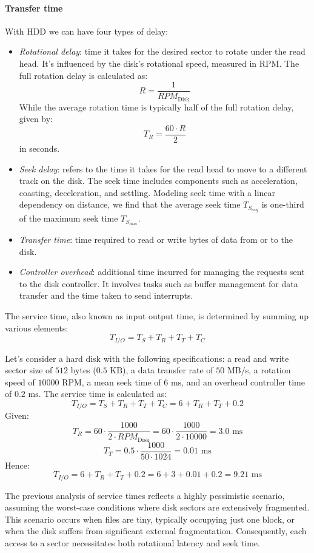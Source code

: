 \paragraph*{Transfer time}
With HDD we can have four types of delay: 
\begin{itemize}
    \item \textit{Rotational delay}: time it takes for the desired sector to rotate under the read head. 
        It's influenced by the disk's rotational speed, measured in RPM.
        The full rotation delay is calculated as: 
        \[R=\dfrac{1}{RPM_{\text{Disk}}}\]
        While the average rotation time is typically half of the full rotation delay, given by: 
        \[T_{R}=\dfrac{60\cdot R}{2}\]
        in seconds.
    \item \textit{Seek delay}: refers to the time it takes for the read head to move to a different track on the disk. 
        The seek time includes components such as acceleration, coasting, deceleration, and settling. 
        Modeling seek time with a linear dependency on distance, we find that the average seek time $T_{S_{avg}}$ is one-third of the maximum seek time $T_{S_{\max}}$. 
    \item \textit{Transfer time}: time required to read or write bytes of data from or to the disk. 
    \item \textit{Controller overhead}: additional time incurred for managing the requests sent to the disk controller.
        It involves tasks such as buffer management for data transfer and the time taken to send interrupts.
\end{itemize}
The service time, also known as input output time, is determined by summing up various elements:
\[T_{I/O}=T_{S}+T_{R}+T_{T}+T_{C}\]
\begin{example}
    Let's consider a hard disk with the following specifications: a read and write sector size of $512$ bytes ($0.5\text{ KB}$), a data transfer rate of $50$ MB/s, a rotation speed of $10000$ RPM, a mean seek time of $6\text{ ms}$, and an overhead controller time of $0.2\text{ ms}$.
    The service time is calculated as:
    \[T_{I/O}=T_{S}+T_{R}+T_{T}+T_{C}=6+T_{R}+T_{T}+0.2\]
    Given:
    \[T_{R}=60\cdot\dfrac{1000}{2 \cdot RPM_{\text{Disk}}}=60\cdot\dfrac{1000}{2 \cdot 10000}=3.0\text{ ms}\]
    \[T_{T}=0.5\cdot\dfrac{1000}{50 \cdot 1024}=0.01\text{ ms}\]
    Hence:
    \[T_{I/O}=6+T_{R}+T_{T}+0.2=6+3+0.01+0.2=9.21\text{ ms}\]
\end{example}
The previous analysis of service times reflects a highly pessimistic scenario, assuming the worst-case conditions where disk sectors are extensively fragmented. 
This scenario occurs when files are tiny, typically occupying just one block, or when the disk suffers from significant external fragmentation. 
Consequently, each access to a sector necessitates both rotational latency and seek time.

